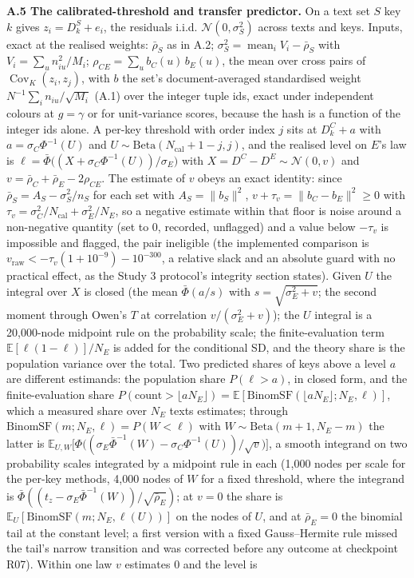 \documentclass[11pt,letterpaper]{article}
\begin{document}
\textbf{A.5 The calibrated-threshold and transfer predictor.} On a text set \(S\) key \(k\) gives \(z_i = D_k^S + e_i\), the residuals i.i.d. \(\mathcal N(0, \sigma_S^2)\) across texts and keys. Inputs, exact at the realised weights: \(\bar\rho_S\) as in A.2; \(\sigma_S^2 = \operatorname{mean}_i V_i - \bar\rho_S\) with \(V_i = \sum_u n_{iu}^2/M_i\); \(\rho_{CE} = \sum_u b_C(u)\, b_E(u)\), the mean over cross pairs of \(\operatorname{Cov}_K(z_i, z_j)\), with \(b\) the set's document-averaged standardised weight \(N^{-1}\sum_i n_{iu}/\sqrt{M_i}\) (A.1) over the integer tuple ids, exact under independent colours at \(g = \gamma\) or for unit-variance scores, because the hash is a function of the integer ids alone. A per-key threshold with order index \(j\) sits at \(D_k^C + a\) with \(a = \sigma_C\Phi^{-1}(U)\) and \(U \sim \mathrm{Beta}(N_{\mathrm{cal}} + 1 - j, j)\), and the realised level on \(E\)'s law is \(\ell = \bar\Phi\bigl((X + \sigma_C\Phi^{-1}(U))/\sigma_E\bigr)\) with \(X = D^C - D^E \sim \mathcal N(0, v)\) and \(v = \bar\rho_C + \bar\rho_E - 2\rho_{CE}\). The estimate of \(v\) obeys an exact identity: since \(\bar\rho_S = A_S - \sigma_S^2/n_S\) for each set with \(A_S = \lVert b_S\rVert^2\), \(v + \tau_v = \lVert b_C - b_E\rVert^2 \ge 0\) with \(\tau_v = \sigma_C^2/N_{\mathrm{cal}} + \sigma_E^2/N_E\), so a negative estimate within that floor is noise around a non-negative quantity (set to \(0\), recorded, unflagged) and a value below \(-\tau_v\) is impossible and flagged, the pair ineligible (the implemented comparison is \(v_{\mathrm{raw}} < -\tau_v(1 + 10^{-9}) - 10^{-300}\), a relative slack and an absolute guard with no practical effect, as the Study 3 protocol's integrity section states). Given \(U\) the integral over \(X\) is closed (the mean \(\bar\Phi(a/s)\) with \(s = \sqrt{\sigma_E^2 + v}\); the second moment through Owen's \(T\) at correlation \(v/(\sigma_E^2 + v)\)); the \(U\) integral is a 20,000-node midpoint rule on the probability scale; the finite-evaluation term \(\mathbb{E}[\ell(1-\ell)]/N_E\) is added for the conditional SD, and the theory share is the population variance over the total. Two predicted shares of keys above a level \(a\) are different estimands: the population share \(P(\ell > a)\), in closed form, and the finite-evaluation share \(P(\mathrm{count} > \lfloor a N_E\rfloor) = \mathbb{E}[\mathrm{BinomSF}(\lfloor a N_E\rfloor; N_E, \ell)]\), which a measured share over \(N_E\) texts estimates; through \(\mathrm{BinomSF}(m; N_E, \ell) = P(W < \ell)\) with \(W \sim \mathrm{Beta}(m + 1, N_E - m)\) the latter is \(\mathbb{E}_{U, W}\bigl[\Phi\bigl((\sigma_E\bar\Phi^{-1}(W) - \sigma_C\Phi^{-1}(U))/\sqrt v\bigr)\bigr]\), a smooth integrand on two probability scales integrated by a midpoint rule in each (1,000 nodes per scale for the per-key methods, 4,000 nodes of \(W\) for a fixed threshold, where the integrand is \(\bar\Phi((t_z - \sigma_E\bar\Phi^{-1}(W))/\sqrt{\bar\rho_E})\); at \(v = 0\) the share is \(\mathbb{E}_U[\mathrm{BinomSF}(m; N_E, \ell(U))]\) on the nodes of \(U\), and at \(\bar\rho_E = 0\) the binomial tail at the constant level; a first version with a fixed Gauss--Hermite rule missed the tail's narrow transition and was corrected before any outcome at checkpoint R07). Within one law \(v\) estimates \(0\) and the level is 
\end{document}

